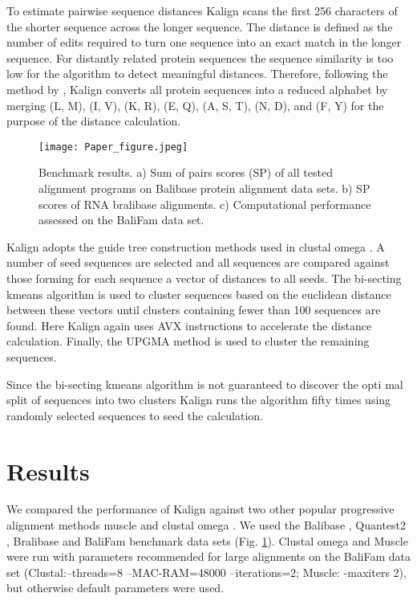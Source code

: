 \documentclass[nocrop]{bioinfo}
\begin{document}
To estimate pairwise sequence distances Kalign scans the first 256 characters of the shorter sequence across the longer sequence. The distance is defined as the number of edits required to turn one sequence into an exact match in the longer sequence. For distantly related protein sequences the sequence similarity is too low for the algorithm to detect meaningful distances. Therefore, following the method by \cite{steinegger2018clustering}, Kalign converts all protein sequences into a reduced alphabet by merging (L, M), (I, V), (K, R), (E, Q), (A, S, T), (N, D), and (F, Y) for the purpose of the distance calculation. 

\begin{figure}[!tpb]%
  \centerline{\texttt{[image: Paper\_figure.jpeg]}}
  \caption{Benchmark results. a) Sum of pairs scores (SP) of all tested alignment programs on Balibase protein alignment data sets. b) SP scores of RNA bralibase alignments. c) Computational performance assessed on the BaliFam data set.}\label{fig:01}
\end{figure}

Kalign adopts the guide tree construction methods used in clustal omega \citep{sievers2011fast}. A number of seed sequences are selected and all sequences are compared against those forming for each sequence a vector of distances to all seeds. The bi-secting kmeans algorithm is used to cluster sequences based on the euclidean distance between these vectors until clusters containing fewer than 100 sequences are found. Here Kalign again uses AVX instructions to accelerate the distance calculation. Finally, the UPGMA method is used to cluster the remaining sequences.

Since the bi-secting kmeans algorithm is not guaranteed to discover the opti{\color{red} mal} split of sequence{\color{red}s} into two clusters Kalign runs the algorithm {\color{red}fifty} times using randomly selected sequences to seed the calculation. 

\section{Results}
We compared the performance of Kalign against two other popular progressive alignment methods muscle \citep{edgar2004muscle} and clustal omega \citep{sievers2011fast}. We used the Balibase \citep{thompson1999balibase}, Quantest2 \citep{sievers2019quantest2}, Bralibase \citep{gardner2005benchmark} and BaliFam benchmark data sets (Fig. \ref{fig:01}). Clustal omega and Muscle were run with parameters recommended for large alignments on the BaliFam data set (Clustal:--threads=8 --MAC-RAM=48000 --iterations=2; Muscle:  -maxiters 2), but otherwise default parameters were used.
\end{document}
